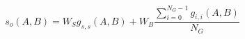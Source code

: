 \begin{equation}
s_o(A,B) = W_S g_{s,s}(A,B) + W_B \frac{\sum_{i=0}^{N_G-1} g_{i,i}(A,B)}{N_G}
\label{eq:song_distance_ordered}
\end{equation}
